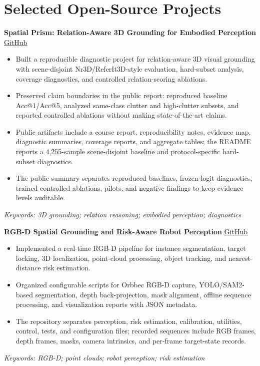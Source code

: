 \documentclass[a4paper,9pt]{extarticle}
\begin{document}
\section*{Selected Open-Source Projects}
\textbf{Spatial Prism: Relation-Aware 3D Grounding for Embodied Perception}
\hfill \href{https://github.com/checheng117/relation-aware-3d-grounding}{GitHub}\\
\begin{itemize}
  \item Built a reproducible diagnostic project for relation-aware 3D visual
  grounding with scene-disjoint Nr3D/ReferIt3D-style evaluation, hard-subset
  analysis, coverage diagnostics, and controlled relation-scoring ablations.
  \item Preserved claim boundaries in the public report: reproduced baseline
  Acc@1/Acc@5, analyzed same-class clutter and high-clutter subsets, and reported
  controlled ablations without making state-of-the-art claims.
  \item Public artifacts include a course report, reproducibility notes, evidence map,
  diagnostic summaries, coverage reports, and aggregate tables; the README reports a
  4,255-sample scene-disjoint baseline and protocol-specific hard-subset diagnostics.
  \item The public summary separates reproduced baselines, frozen-logit diagnostics,
  trained controlled ablations, pilots, and negative findings to keep evidence levels
  auditable.
\end{itemize}
\textit{Keywords: 3D grounding; relation reasoning; embodied perception; diagnostics}
\vspace{0.34\baselineskip}

\textbf{RGB-D Spatial Grounding and Risk-Aware Robot Perception}
\hfill \href{https://github.com/checheng117/rgbd-spatial-grounding}{GitHub}\\
\begin{itemize}
  \item Implemented a real-time RGB-D pipeline for instance segmentation, target
  locking, 3D localization, point-cloud processing, object tracking, and
  nearest-distance risk estimation.
  \item Organized configurable scripts for Orbbec RGB-D capture, YOLO/SAM2-based
  segmentation, depth back-projection, mask alignment, offline sequence processing,
  and visualization reports with JSON metadata.
  \item The repository separates perception, risk estimation, calibration, utilities,
  control, tests, and configuration files; recorded sequences include RGB frames,
  depth frames, masks, camera intrinsics, and per-frame target-state records.
\end{itemize}
\textit{Keywords: RGB-D; point clouds; robot perception; risk estimation}
\vspace{0.34\baselineskip}
\end{document}
